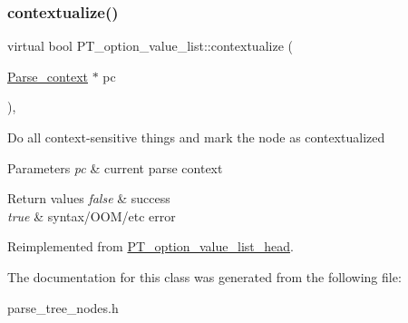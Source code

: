\subsubsection{\texorpdfstring{contextualize()}{contextualize()}}
{\footnotesize\ttfamily virtual bool P\+T\+\_\+option\+\_\+value\+\_\+list\+::contextualize (\begin{DoxyParamCaption}\item[{\mbox{\hyperlink{structParse__context}{Parse\+\_\+context}} $\ast$}]{pc }\end{DoxyParamCaption})\hspace{0.3cm}{\ttfamily [inline]}, {\ttfamily [virtual]}}

Do all context-\/sensitive things and mark the node as contextualized


\begin{DoxyParams}{Parameters}
{\em pc} & current parse context\\
\hline
\end{DoxyParams}

\begin{DoxyRetVals}{Return values}
{\em false} & success \\
\hline
{\em true} & syntax/\+O\+O\+M/etc error \\
\hline
\end{DoxyRetVals}


Reimplemented from \mbox{\hyperlink{classPT__option__value__list__head_a211f236acebccd35113f7f991dc9d2fb}{P\+T\+\_\+option\+\_\+value\+\_\+list\+\_\+head}}.



The documentation for this class was generated from the following file\+:\begin{DoxyCompactItemize}
\item 
parse\+\_\+tree\+\_\+nodes.\+h\end{DoxyCompactItemize}
